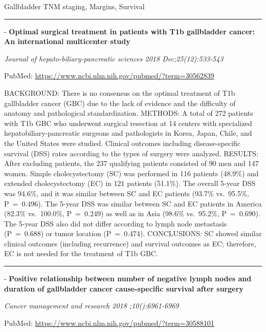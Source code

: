 \documentclass[]{article}
\begin{document}
Gallbladder TNM staging, Margins, Survival

\begin{center}\rule{0.5\linewidth}{\linethickness}\end{center}

 - \textbf{Optimal surgical treatment in patients with T1b gallbladder
cancer: An international multicenter study}

\emph{Journal of hepato-biliary-pancreatic sciences 2018
Dec;25(12):533-543}

PubMed: \url{https://www.ncbi.nlm.nih.gov/pubmed/?term=30562839}

BACKGROUND: There is no consensus on the optimal treatment of T1b
gallbladder cancer (GBC) due to the lack of evidence and the difficulty
of anatomy and pathological standardization. METHODS: A total of 272
patients with T1b GBC who underwent surgical resection at 14 centers
with specialized hepatobiliary-pancreatic surgeons and pathologists in
Korea, Japan, Chile, and the United States were studied. Clinical
outcomes including disease-specific survival (DSS) rates according to
the types of surgery were analyzed. RESULTS: After excluding patients,
the 237 qualifying patients consisted of 90 men and 147 women. Simple
cholecystectomy (SC) was performed in 116 patients (48.9\%) and extended
cholecystectomy (EC) in 121 patients (51.1\%). The overall 5-year DSS
was 94.6\%, and it was similar between SC and EC patients (93.7\%
vs.~95.5\%, P~=~0.496). The 5-year DSS was similar between SC and EC
patients in America (82.3\% vs.~100.0\%, P~=~0.249) as well as in Asia
(98.6\% vs.~95.2\%, P~=~0.690). The 5-year DSS also did not differ
according to lymph node metastasis (P~=~0.688) or tumor location
(P~=~0.474). CONCLUSIONS: SC showed similar clinical outcomes (including
recurrence) and survival outcomes as EC; therefore, EC is not needed for
the treatment of T1b GBC.

{}

{}

\begin{center}\rule{0.5\linewidth}{\linethickness}\end{center}

 - \textbf{Positive relationship between number of negative lymph nodes
and duration of gallbladder cancer cause-specific survival after
surgery}

\emph{Cancer management and research 2018 ;10():6961-6969}

PubMed: \url{https://www.ncbi.nlm.nih.gov/pubmed/?term=30588101}
\end{document}
